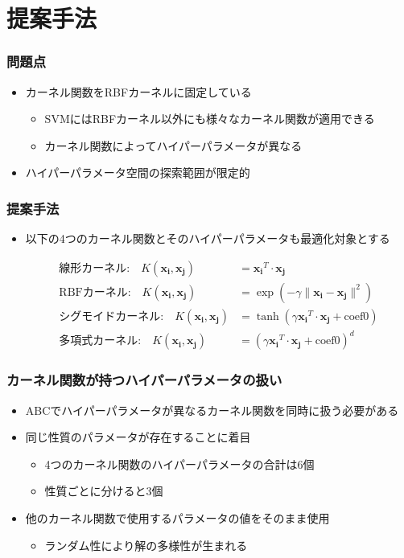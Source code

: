 \documentclass[11pt,dvipdfmx,cjk]{beamer}
\begin{document}
\section{提案手法}
  \begin{frame}
    \frametitle{問題点}
    \begin{itemize}
      \item カーネル関数をRBFカーネルに固定している
      \begin{itemize}
       \item SVMにはRBFカーネル以外にも様々なカーネル関数が適用できる      
      \item カーネル関数によってハイパーパラメータが異なる
    \end{itemize}
    \item ハイパーパラメータ空間の探索範囲が限定的
  \end{itemize}
\end{frame}
  
  \begin{frame}
    \frametitle{提案手法}
    \begin{itemize}
      \item 以下の4つのカーネル関数とそのハイパーパラメータも最適化対象とする
      
      \begin{align*}
        \text{線形カーネル:} \quad K(\boldsymbol{x_i}, \boldsymbol{x_j}) &= \boldsymbol{x_i}^T \cdot \boldsymbol{x_j} \\
        \text{RBFカーネル:} \quad K(\boldsymbol{x_i}, \boldsymbol{x_j}) &= \exp\left(-\gamma \| \boldsymbol{x_i} - \boldsymbol{x_j} \|^2\right) \\
        \text{シグモイドカーネル:} \quad K(\boldsymbol{x_i}, \boldsymbol{x_j}) &= \tanh(\gamma \boldsymbol{x_i}^T \cdot \boldsymbol{x_j} + \text{coef0}) \\
        \text{多項式カーネル:} \quad K(\boldsymbol{x_i}, \boldsymbol{x_j}) &= (\gamma\boldsymbol{x_i}^T \cdot \boldsymbol{x_j} + \text{coef0})^d
       \end{align*}
    \end{itemize}
  \end{frame}
\begin{frame}
  \frametitle{カーネル関数が持つハイパーパラメータの扱い}
  \begin{itemize}
  \item ABCでハイパーパラメータが異なるカーネル関数を同時に扱う必要がある
  \item  同じ性質のパラメータが存在することに着目
      \begin{itemize}
      \item 4つのカーネル関数のハイパーパラメータの合計は6個
      \item 性質ごとに分けると3個
     \end{itemize}
  \item  他のカーネル関数で使用するパラメータの値をそのまま使用
     \begin{itemize}
     \item  ランダム性により解の多様性が生まれる
    \end{itemize}
  \end{itemize}
\end{frame}
\end{document}
